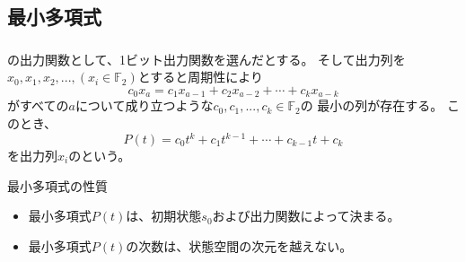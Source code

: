 \documentclass[cjk, dvips, handout, trans, xcolor=dvipsnames]{beamer}
\def\F2{{\mathbb F}_2}
\begin{document}
\subsection{最小多項式}
\begin{frame}[t]
  \frametitle{\insertsubsection}
  \FLPRNG の出力関数として、1ビット出力関数を選んだとする。
  そして出力列を$x_0, x_1, x_2, ..., (x_i \in \F2)$とすると周期性により
  \[
  c_0x_a = c_1x_{a-1} + c_{2}x_{a-2} + \cdots + c_{k}x_{a-k}
  \]
  がすべての$a$について成り立つような$c_0,c_1,...,c_k \in \F2$の
  最小の列が存在する。
  このとき、
  \[
  P(t) = c_0t^k + c_1t^{k-1} + \cdots + c_{k-1}t + c_{k}
  \]
  を出力列$x_i$のという。

  \pause
  \begin{block}{最小多項式の性質}
    \begin{itemize}
    \item 最小多項式$P(t)$は、初期状態$s_0$および出力関数によって決まる。
    \item 最小多項式$P(t)$の次数は、状態空間の次元を越えない。
    \end{itemize}
  \end{block}

\end{frame}
\end{document}
